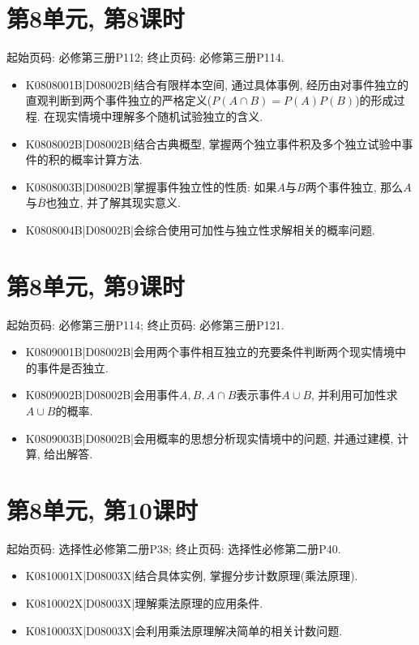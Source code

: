 \section*{第8单元, 第8课时}
起始页码: 必修第三册P112; 终止页码: 必修第三册P114.
\begin{itemize}
\item K0808001B|D08002B|结合有限样本空间, 通过具体事例, 经历由对事件独立的直观判断到两个事件独立的严格定义($P(A\cap B)=P(A)P(B)$)的形成过程. 在现实情境中理解多个随机试验独立的含义.
\item K0808002B|D08002B|结合古典概型, 掌握两个独立事件积及多个独立试验中事件的积的概率计算方法.
\item K0808003B|D08002B|掌握事件独立性的性质: 如果$A$与$B$两个事件独立, 那么$A$与$\overline B$也独立, 并了解其现实意义.
\item K0808004B|D08002B|会综合使用可加性与独立性求解相关的概率问题.
\end{itemize}

\section*{第8单元, 第9课时}
起始页码: 必修第三册P114; 终止页码: 必修第三册P121.
\begin{itemize}
\item K0809001B|D08002B|会用两个事件相互独立的充要条件判断两个现实情境中的事件是否独立.
\item K0809002B|D08002B|会用事件$A,B,A\cap B$表示事件$A\cup B$, 并利用可加性求$A\cup B$的概率.
\item K0809003B|D08002B|会用概率的思想分析现实情境中的问题, 并通过建模, 计算, 给出解答.
\end{itemize}

\section*{第8单元, 第10课时}
起始页码: 选择性必修第二册P38; 终止页码: 选择性必修第二册P40.
\begin{itemize}
\item K0810001X|D08003X|结合具体实例, 掌握分步计数原理(乘法原理).
\item K0810002X|D08003X|理解乘法原理的应用条件.
\item K0810003X|D08003X|会利用乘法原理解决简单的相关计数问题.
\end{itemize}

